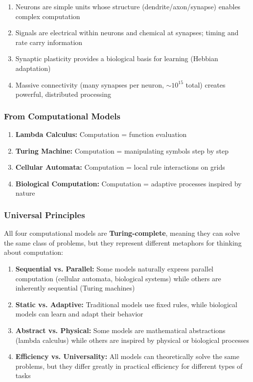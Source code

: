 \begin{enumerate}
\item Neurons are simple units whose structure (dendrite/axon/synapse) enables complex computation
\item Signals are electrical within neurons and chemical at synapses; timing and rate carry information
\item Synaptic plasticity provides a biological basis for learning (Hebbian adaptation)
\item Massive connectivity (many synapses per neuron, $\sim 10^{15}$ total) creates powerful, distributed processing
\end{enumerate}

\subsubsection{From Computational Models}
\label{subsubsec:insights-computational-models}

\begin{enumerate}
\item \textbf{Lambda Calculus:} Computation = function evaluation
\item \textbf{Turing Machine:} Computation = manipulating symbols step by step
\item \textbf{Cellular Automata:} Computation = local rule interactions on grids
\item \textbf{Biological Computation:} Computation = adaptive processes inspired by nature
\end{enumerate}

\subsubsection{Universal Principles}
\label{subsubsec:universal-principles}

All four computational models are \textbf{Turing-complete}, meaning they can solve the same class of problems, but they represent different metaphors for thinking about computation:

\begin{enumerate}
\item \textbf{Sequential vs. Parallel:} Some models naturally express parallel computation (cellular automata, biological systems) while others are inherently sequential (Turing machines)

\item \textbf{Static vs. Adaptive:} Traditional models use fixed rules, while biological models can learn and adapt their behavior

\item \textbf{Abstract vs. Physical:} Some models are mathematical abstractions (lambda calculus) while others are inspired by physical or biological processes

\item \textbf{Efficiency vs. Universality:} All models can theoretically solve the same problems, but they differ greatly in practical efficiency for different types of tasks
\end{enumerate}

